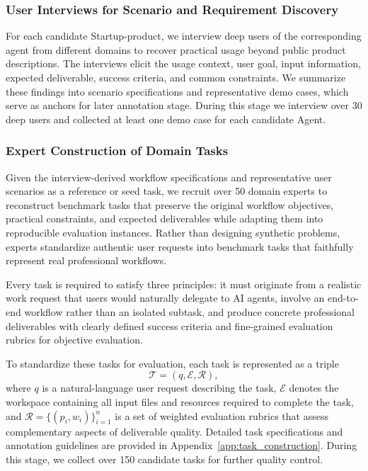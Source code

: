 \subsubsection{User Interviews for Scenario and Requirement Discovery}

For each candidate Startup-product, we interview deep users of the corresponding agent from different domains to recover practical usage beyond public product descriptions. The interviews elicit the usage context, user goal, input information, expected deliverable, success criteria, and common constraints. We summarize these findings into scenario specifications and representative demo cases, which serve as anchors for later annotation stage.
During this stage we interview over 30 deep users and collected at least one demo case for each candidate Agent.


\subsubsection{Expert Construction of Domain Tasks}



Given the interview-derived workflow specifications and representative user scenarios as a reference or seed task, we recruit over 50 domain experts to reconstruct benchmark tasks that preserve the original workflow objectives, practical constraints, and expected deliverables while adapting them into reproducible evaluation instances. Rather than designing synthetic problems, experts standardize authentic user requests into benchmark tasks that faithfully represent real professional workflows.

Every task is required to satisfy three principles: it must originate from a realistic work request that users would naturally delegate to AI agents, involve an end-to-end workflow rather than an isolated subtask, and produce concrete professional deliverables with clearly defined success criteria and fine-grained evaluation rubrics for objective evaluation.

To standardize these tasks for evaluation, each task is represented as a triple
\[
\mathcal{T}=(q,\mathcal{E},\mathcal{R}),
\]
where $q$ is a natural-language user request describing the task, $\mathcal{E}$ denotes the workspace containing all input files and resources required to complete the task, and $\mathcal{R}=\{(p_i,w_i)\}_{i=1}^{n}$ is a set of weighted evaluation rubrics that assess complementary aspects of deliverable quality. Detailed task specifications and annotation guidelines are provided in Appendix~\ref{app:task_construction}. During this stage, we collect over 150 candidate tasks for further quality control.







